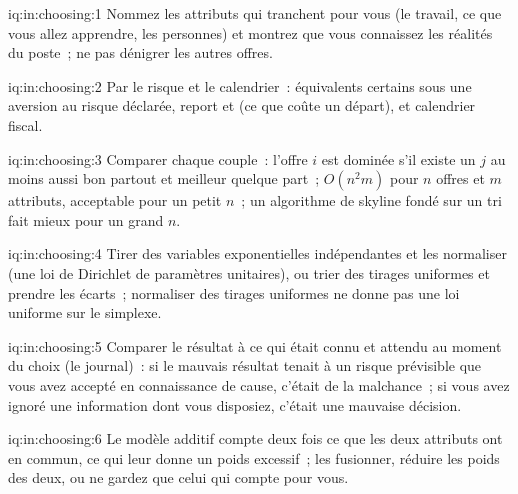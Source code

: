 \begin{solution}{iq:in:choosing:1}
Nommez les attributs qui tranchent pour vous (le travail, ce que vous allez apprendre, les personnes) et montrez que vous connaissez les réalités du poste~;
ne pas dénigrer les autres offres.
\end{solution}

\begin{solution}{iq:in:choosing:2}
Par le risque et le calendrier~: équivalents certains sous une aversion au risque déclarée, report et  (ce que coûte un départ), et
calendrier fiscal.
\end{solution}

\begin{solution}{iq:in:choosing:3}
Comparer chaque couple~: l'offre $i$ est dominée s'il existe un $j$ au moins aussi bon partout et meilleur quelque part~; $O(n^2m)$ pour
$n$ offres et $m$ attributs, acceptable pour un petit $n$~; un algorithme de skyline fondé sur un tri fait mieux pour un grand $n$.
\end{solution}

\begin{solution}{iq:in:choosing:4}
Tirer des variables exponentielles indépendantes et les normaliser (une loi de Dirichlet de paramètres unitaires), ou trier des tirages uniformes et
prendre les écarts~; normaliser des tirages uniformes ne donne pas une loi uniforme sur le simplexe.
\end{solution}

\begin{solution}{iq:in:choosing:5}
Comparer le résultat à ce qui était connu et attendu au moment du choix (le journal)~: si le mauvais résultat tenait à un risque prévisible
que vous avez accepté en connaissance de cause, c'était de la malchance~; si vous avez ignoré une information dont vous disposiez, c'était une mauvaise décision.
\end{solution}

\begin{solution}{iq:in:choosing:6}
Le modèle additif compte deux fois ce que les deux attributs ont en commun, ce qui leur donne un poids excessif~; les fusionner, réduire les poids
des deux, ou ne gardez que celui qui compte pour vous.
\end{solution}
